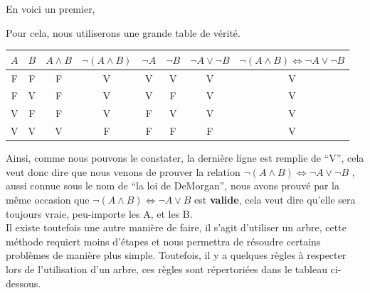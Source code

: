\documentclass[a4paper, 12pt]{article}
\newcommand{\ffi}{\Leftrightarrow}
\numberwithin{equation}{subsection}
\begin{document}
  En voici un premier,
  \begin{center}
    \Ovalbox{$ \neg (A \land B ) \ffi \neg A \lor \neg B$}
  \end{center}
  Pour cela, nous utiliserons une grande table de vérité.
  \begin{table}[H]
    \centering
    \begin{tabular}{|c|c|c|c|c|c|c|c|}
      \hline $A$ & $B$ & $A \land B$ & $\neg (A \land B)$ & $\neg A$ & $\neg B$ & $\neg A \lor \neg B$ & $\neg (A \land B) \ffi \neg A \lor \neg B$ \\
      \hline  F  &  F  &      F      &          V         &     V    &     V    &          V           &                     V                      \\
              F  &  V  &      F      &          V         &     V    &     F    &          V           &                     V                      \\
              V  &  F  &      F      &          V         &     F    &     V    &          V           &                     V                      \\
              V  &  V  &      V      &          F         &     F    &     F    &          F           &                     V                      \\
      \hline
    \end{tabular}
  \end{table}
  Ainsi, comme nous pouvons le constater, la dernière ligne est remplie de ``V'', cela veut donc dire que nous venons de prouver la relation $\neg (A \land B) \ffi \neg A \lor \neg B$ , aussi connue sous le nom de ``la loi de DeMorgan'', nous avons prouvé par la même occasion que $\neg (A \land B) \ffi \neg A \lor B$ est {\bf valide}, cela veut dire qu'elle sera toujours vraie, peu-importe les A, et les B.\\
  Il existe toutefois une autre manière de faire, il s'agit d'utiliser un arbre, cette méthode requiert moins d'étapes et nous permettra de résoudre certains problèmes de manière plus simple. Toutefois, il y a quelques règles à respecter lors de l'utilisation d'un arbre, ces  règles sont répertoriées dans le tableau ci-dessous. \\
\end{document}
